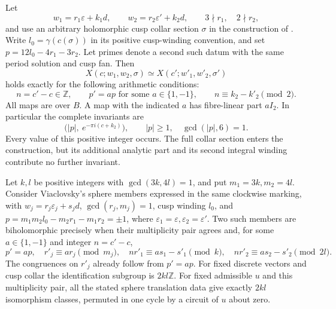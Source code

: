 
\begin{proposition}\hypertarget{tag-01QB}{}\label{fam:src:B.2.1}\label{fam:st:B.2.1}

Let
\[
 w_1=r_1\varepsilon+k_1d,\qquad w_2=r_2\varepsilon'+k_2d,
 \qquad 3\nmid r_1,\quad 2\nmid r_2,
\]
and use an arbitrary holomorphic cusp collar section $\sigma$ in the construction of \cite[Section~6.4, pp.~39--40]{AC2026}. Write $l_0=\gamma(c(\sigma))$ in its positive cusp-winding convention, and set $p=12l_0-4r_1-3r_2$. Let primes denote a second such datum with the same period solution and cusp fan. Then
\[
 X(c;w_1,w_2,\sigma)\simeq X(c';w'_1,w'_2,\sigma')
\]
holds exactly for the following arithmetic conditions:
\[
 n=c'-c\in\mathbb Z,\qquad
 p'=a p\text{ for some }a\in\{1,-1\},\qquad
 n\equiv k_2-k'_2\pmod2.
\]
All maps are over $B$. A map with the indicated $a$ has fibre-linear part $aI_2$. In particular the complete invariants are
\[
 \bigl(|p|,\ e^{-\pi i(c+k_2)}\bigr),\qquad
 |p|\ge1,\quad\gcd(|p|,6)=1.
\]
Every value of this positive integer occurs. The full collar section enters the construction, but its additional analytic part and its second integral winding contribute no further invariant.
\end{proposition}

\begin{proposition}\hypertarget{tag-01QE}{}\label{fam:src:B.3.1}\label{fam:st:B.3.1}

Let $k,l$ be positive integers with $\gcd(3k,4l)=1$, and put $m_1=3k,m_2=4l$. Consider Viaclovsky's sphere members expressed in the same clockwise marking, with $w_j=r_j\varepsilon_j+s_jd$, $\gcd(r_j,m_j)=1$, cusp winding $l_0$, and $p=m_1m_2l_0-m_2r_1-m_1r_2=\pm1$, where $\varepsilon_1=\varepsilon,\varepsilon_2=\varepsilon'$. Two such members are biholomorphic precisely when their multiplicity pair agrees and, for some $a\in\{1,-1\}$ and integer $n=c'-c$,
\[
 p'=ap,\quad r'_j\equiv ar_j\pmod{m_j},\quad
 nr'_1\equiv as_1-s'_1\pmod{k},\quad
 nr'_2\equiv as_2-s'_2\pmod{2l}.
\]
The congruences on $r'_j$ already follow from $p'=ap$. For fixed discrete vectors and cusp collar the identification subgroup is $2kl\mathbb Z$. For fixed admissible $u$ and this multiplicity pair, all the stated sphere translation data give exactly $2kl$ isomorphism classes, permuted in one cycle by a circuit of $u$ about zero.
\end{proposition}


